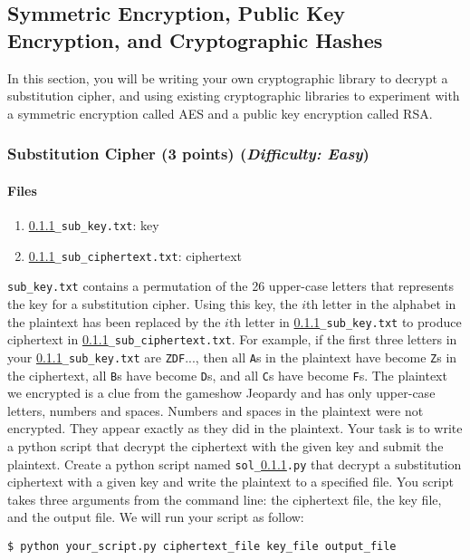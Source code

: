 \documentclass[letterpaper,12pt]{report}
\begin{document}
\subsection{Symmetric Encryption, Public Key Encryption, and Cryptographic Hashes}
\label{sec:encryption_library}
In this section, you will be writing your own cryptographic library to decrypt a substitution cipher, and using existing cryptographic libraries to experiment with a symmetric encryption called AES and a public key encryption called RSA.

\subsubsection{Substitution Cipher (3 points)  \hfill\rm\normalsize (\emph{Difficulty: Easy})}
\label{sec:substitution_cipher}
\paragraph{Files}

\begin{enumerate}
\item {\tt \ref{sec:substitution_cipher}\_sub\_key.txt}: key
\item {\tt \ref{sec:substitution_cipher}\_sub\_ciphertext.txt}: ciphertext
\end{enumerate}

{\tt sub\_key.txt} contains a permutation of the 26 upper-case letters that represents the key for a substitution cipher. Using this key, the $i$th letter in the alphabet in the plaintext has been replaced by the $i$th letter in {\tt \ref{sec:substitution_cipher}\_sub\_key.txt} to produce ciphertext in {\tt \ref{sec:substitution_cipher}\_sub\_ciphertext.txt}. For example, if the first three letters in your {\tt \ref{sec:substitution_cipher}\_sub\_key.txt} are {\tt ZDF}..., then all {\tt A}s in the plaintext have become {\tt Z}s in the ciphertext, all {\tt B}s have become {\tt D}s, and all {\tt C}s have become {\tt F}s. The plaintext we encrypted is a clue from the gameshow Jeopardy and has only upper-case letters, numbers and spaces. Numbers and spaces in the plaintext were not encrypted. They appear exactly as they did in the plaintext.  Your task is to write a python script that decrypt the ciphertext with the given key and submit the plaintext.  Create a python script named {\tt sol\_\ref{sec:substitution_cipher}.py} that decrypt a substitution ciphertext with a given key and write the plaintext to a specified file.  You script takes three arguments from the command line: the ciphertext file, the key file, and the output file. We will run your script as follow:
\begin{mdframed}
\begin{verbatim}
$ python your_script.py ciphertext_file key_file output_file
\end{verbatim}
\end{mdframed}
\end{document}
